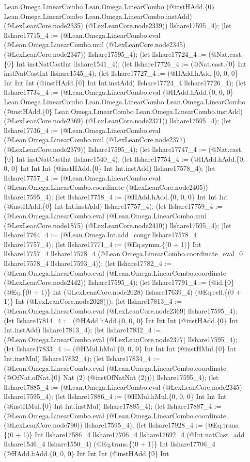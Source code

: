 \documentclass[11pt]{article}
\begin{document}
Lean.Omega.LinearCombo Lean.Omega.LinearCombo (@instHAdd.\{0\} Lean.Omega.LinearCombo Lean.Omega.LinearCombo.instAdd) (@LexLeanCore.node2335) (@LexLeanCore.node2339)) llshare17595\_4); (let llshare17715\_4 := (@Lean.Omega.LinearCombo.eval (@Lean.Omega.LinearCombo.mul (@LexLeanCore.node2345) (@LexLeanCore.node2347)) llshare17595\_4); (let llshare17724\_4 := (@Nat.cast.\{0\} Int instNatCastInt llshare1541\_4); (let llshare17726\_4 := (@Nat.cast.\{0\} Int instNatCastInt llshare1545\_4); (let llshare17727\_4 := (@HAdd.hAdd.\{0, 0, 0\} Int Int Int (@instHAdd.\{0\} Int Int.instAdd) llshare17724\_4 llshare17726\_4); (let llshare17734\_4 := (@Lean.Omega.LinearCombo.eval (@HAdd.hAdd.\{0, 0, 0\} Lean.Omega.LinearCombo Lean.Omega.LinearCombo Lean.Omega.LinearCombo (@instHAdd.\{0\} Lean.Omega.LinearCombo Lean.Omega.LinearCombo.instAdd) (@LexLeanCore.node2369) (@LexLeanCore.node2371)) llshare17595\_4); (let llshare17736\_4 := (@Lean.Omega.LinearCombo.eval (@Lean.Omega.LinearCombo.mul (@LexLeanCore.node2377) (@LexLeanCore.node2379)) llshare17595\_4); (let llshare17747\_4 := (@Nat.cast.\{0\} Int instNatCastInt llshare1540\_4); (let llshare17754\_4 := (@HAdd.hAdd.\{0, 0, 0\} Int Int Int (@instHAdd.\{0\} Int Int.instAdd) llshare17578\_4); (let llshare17757\_4 := (@Lean.Omega.LinearCombo.eval (@Lean.Omega.LinearCombo.coordinate (@LexLeanCore.node2405)) llshare17595\_4); (let llshare17758\_4 := (@HAdd.hAdd.\{0, 0, 0\} Int Int Int (@instHAdd.\{0\} Int Int.instAdd) llshare17757\_4); (let llshare17759\_4 := (@Lean.Omega.LinearCombo.eval (@Lean.Omega.LinearCombo.mul (@LexLeanCore.node1875) (@LexLeanCore.node2410)) llshare17595\_4); (let llshare17764\_4 := (@Lean.Omega.Int.add\_congr llshare17578\_4 llshare17757\_4); (let llshare17771\_4 := (@Eq.symm.\{(0 + 1)\} Int llshare17757\_4 llshare17578\_4 (@Lean.Omega.LinearCombo.coordinate\_eval\_0 llshare17578\_4 llshare17593\_4)); (let llshare17782\_4 := (@Lean.Omega.LinearCombo.eval (@Lean.Omega.LinearCombo.coordinate (@LexLeanCore.node2442)) llshare17595\_4); (let llshare17791\_4 := (@id.\{0\} (@Eq.\{(0 + 1)\} Int (@LexLeanCore.node2028) llshare17639\_4) (@Eq.refl.\{(0 + 1)\} Int (@LexLeanCore.node2028))); (let llshare17813\_4 := (@Lean.Omega.LinearCombo.eval (@LexLeanCore.node2369) llshare17595\_4); (let llshare17814\_4 := (@HAdd.hAdd.\{0, 0, 0\} Int Int Int (@instHAdd.\{0\} Int Int.instAdd) llshare17813\_4); (let llshare17832\_4 := (@Lean.Omega.LinearCombo.eval (@LexLeanCore.node2377) llshare17595\_4); (let llshare17833\_4 := (@HMul.hMul.\{0, 0, 0\} Int Int Int (@instHMul.\{0\} Int Int.instMul) llshare17832\_4); (let llshare17834\_4 := (@Lean.Omega.LinearCombo.eval (@Lean.Omega.LinearCombo.coordinate (@OfNat.ofNat.\{0\} Nat (2) (@instOfNatNat (2)))) llshare17595\_4); (let llshare17885\_4 := (@Lean.Omega.LinearCombo.eval (@LexLeanCore.node2345) llshare17595\_4); (let llshare17886\_4 := (@HMul.hMul.\{0, 0, 0\} Int Int Int (@instHMul.\{0\} Int Int.instMul) llshare17885\_4); (let llshare17887\_4 := (@Lean.Omega.LinearCombo.eval (@Lean.Omega.LinearCombo.coordinate (@LexLeanCore.node790)) llshare17595\_4); (let llshare17928\_4 := (@Eq.trans.\{(0 + 1)\} Int llshare17586\_4 llshare17706\_4 llshare17692\_4 (@Int.natCast\_add llshare1546\_4 llshare1550\_4) (@Eq.trans.\{(0 + 1)\} Int llshare17706\_4 (@HAdd.hAdd.\{0, 0, 0\} Int Int Int (@instHAdd.\{0\} Int 
\end{document}
